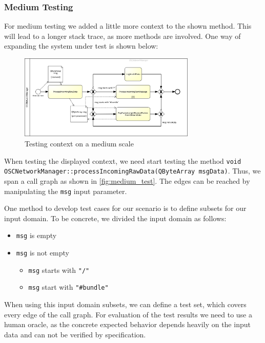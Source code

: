 \documentclass{scrreprt}
\begin{document}
\subsubsection{Medium Testing}

For medium testing we added a little more context to the shown method. This will lead to a longer stack trace, as more methods are involved. One way of expanding the system under test is shown below:

\begin{figure}[h]
	\centering
	\includegraphics[width=0.75\textwidth]{img/2_1_3_medium_test}
	\caption[Medium Testing Context]{Testing context on a medium scale}
	\label{fig:medium_test}
\end{figure}

When testing the displayed context, we need start testing the method \texttt{void OSCNetworkManager::processIncomingRawData(QByteArray msgData)}. Thus, we span a call graph as shown in \vref{fig:medium_test}. The edges can be reached by manipulating the \texttt{msg} input parameter.

One method to develop test cases for our scenario is to define subsets for our input domain. To be concrete, we divided the input domain as follows:

\begin{itemize}
	\item \texttt{msg} is empty
	\item \texttt{msg} is not empty
	
	\begin{itemize}
		\item \texttt{msg} starts with \texttt{"/"}
		\item \texttt{msg} start with \texttt{"\#bundle"}
	\end{itemize}
\end{itemize}

When using this input domain subsets, we can define a test set, which covers every edge of the call graph. For evaluation of the test results we need to use a human oracle, as the concrete expected behavior depends heavily on the input data and can not be verified by specification.
\end{document}
